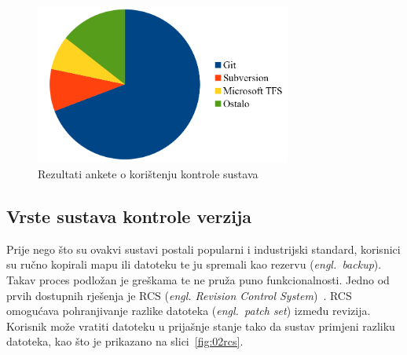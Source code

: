 \begin{figure}[h]
    \centering
    \includegraphics[width=0.75\textwidth]{img/02/so_survey.png}
    \caption{Rezultati ankete o korištenju kontrole sustava}%
    \label{fig:02so_survey}
\end{figure}


\subsection{Vrste sustava kontrole verzija}
Prije nego što su ovakvi sustavi postali popularni i industrijski standard, korisnici su ručno
kopirali mapu ili datoteku te ju spremali kao rezervu (\textit{engl.~backup}). Takav proces podložan
je greškama te ne pruža puno funkcionalnosti. Jedno od prvih dostupnih rješenja je RCS
(\textit{engl. Revision Control System})~\citep{chacon2014pro}. RCS omogućava pohranjivanje
razlike datoteka (\textit{engl.~patch set}) između revizija. Korisnik može vratiti datoteku u
prijašnje stanje tako da sustav primjeni razliku datoteka, kao što je prikazano na
slici~\ref{fig:02rcs}.


